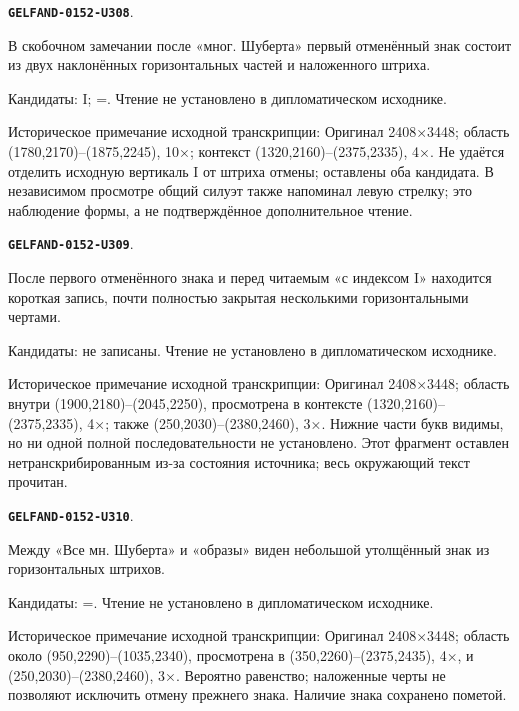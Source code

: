 \documentclass[11pt]{article}
\theoremstyle{definition}
\theoremstyle{remark}
\begin{document}
\par\noindent\leavevmode{}\label{GELFAND-0152-U308}\label{GELFAND-P001402:note-20-first-sign:note}\textbf{\texttt{GELFAND-0152-U308}}.\nopagebreak[4]\par
В скобочном замечании после «мног. Шуберта» первый отменённый знак состоит из двух наклонённых горизонтальных частей и наложенного штриха.\par
Кандидаты: I; =. Чтение не установлено в дипломатическом исходнике.\par
Историческое примечание исходной транскрипции: Оригинал 2408×3448; область (1780,2170)–(1875,2245), 10×; контекст (1320,2160)–(2375,2335), 4×. Не удаётся отделить исходную вертикаль I от штриха отмены; оставлены оба кандидата. В независимом просмотре общий силуэт также напоминал левую стрелку; это наблюдение формы, а не подтверждённое дополнительное чтение.\par\medskip
\par\noindent\leavevmode{}\label{GELFAND-0152-U309}\label{GELFAND-P001402:note-20-cancelled-word:note}\textbf{\texttt{GELFAND-0152-U309}}.\nopagebreak[4]\par
После первого отменённого знака и перед читаемым «с индексом I» находится короткая запись, почти полностью закрытая несколькими горизонтальными чертами. \par
Кандидаты: не записаны. Чтение не установлено в дипломатическом исходнике.\par
Историческое примечание исходной транскрипции: Оригинал 2408×3448; область внутри (1900,2180)–(2045,2250), просмотрена в контексте (1320,2160)–(2375,2335), 4×; также (250,2030)–(2380,2460), 3×. Нижние части букв видимы, но ни одной полной последовательности не установлено. Этот фрагмент оставлен нетранскрибированным из-за состояния источника; весь окружающий текст прочитан.\par\medskip
\par\noindent\leavevmode{}\label{GELFAND-0152-U310}\label{GELFAND-P001402:all-schubert-sign:note}\textbf{\texttt{GELFAND-0152-U310}}.\nopagebreak[4]\par
Между «Все мн. Шуберта» и «образы» виден небольшой утолщённый знак из горизонтальных штрихов.\par
Кандидаты: =. Чтение не установлено в дипломатическом исходнике.\par
Историческое примечание исходной транскрипции: Оригинал 2408×3448; область около (950,2290)–(1035,2340), просмотрена в (350,2260)–(2375,2435), 4×, и (250,2030)–(2380,2460), 3×. Вероятно равенство; наложенные черты не позволяют исключить отмену прежнего знака. Наличие знака сохранено пометой.\par\medskip
\end{document}
